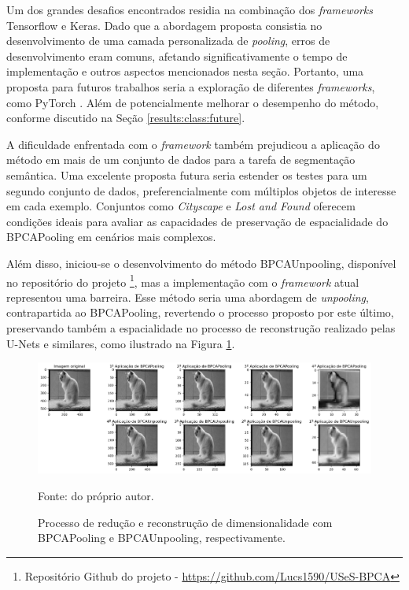 Um dos grandes desafios encontrados residia na combinação dos \textit{frameworks} Tensorflow e Keras. Dado que a abordagem proposta consistia no desenvolvimento de uma camada personalizada de \textit{pooling}, erros de desenvolvimento eram comuns, afetando significativamente o tempo de implementação e outros aspectos mencionados nesta seção. Portanto, uma proposta para futuros trabalhos seria a exploração de diferentes \textit{frameworks}, como PyTorch \citep{Paszke2017AutomaticPyTorch}. Além de potencialmente melhorar o desempenho do método, conforme discutido na Seção \ref{results:class:future}.

A dificuldade enfrentada com o \textit{framework} também prejudicou a aplicação do método em mais de um conjunto de dados para a tarefa de segmentação semântica. Uma excelente proposta futura seria estender os testes para um segundo conjunto de dados, preferencialmente com múltiplos objetos de interesse em cada exemplo. Conjuntos como \textit{Cityscape} \citep{Cordts2016} e \textit{Lost and Found} \citep{Pinggera2016LostVehicles} oferecem condições ideais para avaliar as capacidades de preservação de espacialidade do BPCAPooling em cenários mais complexos.

Além disso, iniciou-se o desenvolvimento do método BPCAUnpooling, disponível no repositório do projeto \footnote{Repositório Github do projeto - \url{https://github.com/Lucs1590/USeS-BPCA}}, mas a implementação com o \textit{framework} atual representou uma barreira. Esse método seria uma abordagem de \textit{unpooling}, contrapartida ao BPCAPooling, revertendo o processo proposto por este último, preservando também a espacialidade no processo de reconstrução realizado pelas U-Nets e similares, como ilustrado na Figura \ref{results:fig:future:0}.

\begin{figure}[H]
    \centering
    \caption{Processo de redução e reconstrução de dimensionalidade com BPCAPooling e BPCAUnpooling, respectivamente.}
    \label{results:fig:future:0}
    \includegraphics[width=1\textwidth]{recursos/imagens/results/bpca_unpooling.png}

    Fonte: do próprio autor.
\end{figure}

